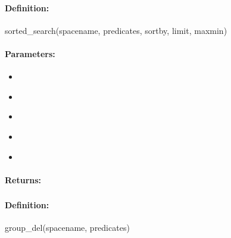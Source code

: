 \paragraph{Definition:}
\begin{rubycode}
sorted_search(spacename, predicates, sortby, limit, maxmin)
\end{rubycode}

\paragraph{Parameters:}
\begin{itemize}[noitemsep]
\item {}\\

\item {}\\

\item {}\\

\item {}\\

\item {}\\

\end{itemize}

\paragraph{Returns:}


\pagebreak
\subsubsection{}
\label{api:ruby:group_del}


\paragraph{Definition:}
\begin{rubycode}
group_del(spacename, predicates)
\end{rubycode}

